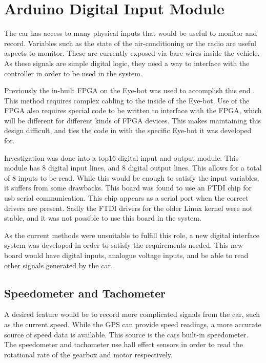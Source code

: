

\section{Arduino Digital Input Module}
\label{sec:arduino}

The car has access to many physical inputs that would be useful to monitor and record. Variables such as the state of the air-conditioning or the radio are useful aspects to monitor. These are currently exposed via bare wires inside the vehicle. As these signals are simple digital logic, they need a way to interface with the controller in order to be used in the system.

Previously the in-built FPGA on the Eye-bot was used to accomplish this end \cite{thesis_varma}. This method requires complex cabling to the inside of the Eye-bot. Use of the FPGA also requires special code to be written to interface with the FPGA, which will be different for different kinds of FPGA devices. This makes maintaining this design difficult, and ties the code in with the specific Eye-bot it was developed for.

Investigation was done into a top16 digital input and output module. This module has 8 digital input lines, and 8 digital output lines. This allows for a total of 8 inputs to be read. While this would be enough to satisfy the input variables, it suffers from some drawbacks. This board was found to use an FTDI chip for usb serial communication. This chip appears as a serial port when the correct drivers are present. Sadly the FTDI drivers for the older Linux kernel were not stable, and it was not possible to use this board in the system.

As the current methods were unsuitable to fulfill this role, a new digital interface system was developed in order to satisfy the requirements needed. This new board would have digital inputs, analogue voltage inputs, and be able to read other signals generated by the car.

\subsection{Speedometer and Tachometer}

A desired feature would be to record more complicated signals from the car, such as the current speed. While the GPS can provide speed readings, a more accurate source of speed data is available. This source is the cars built-in speedometer. The speedometer and tachometer use hall effect sensors in order to read the rotational rate of the gearbox and motor respectively. 

